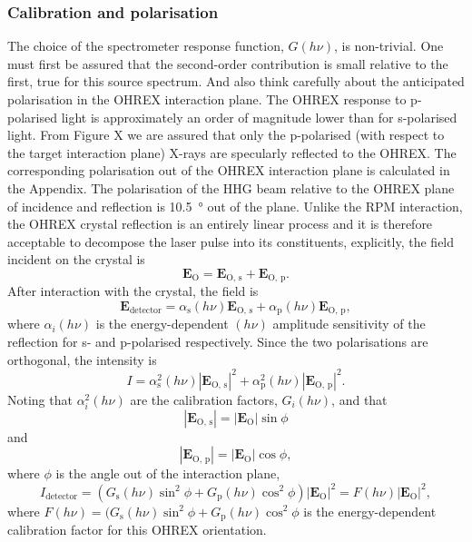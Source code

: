 \subsubsection{Calibration and polarisation}
The choice of the spectrometer response function, $G(h\nu)$, is non-trivial. One must first be assured that the second-order contribution is small relative to the first, true for this source spectrum. And also think carefully about the anticipated polarisation in the OHREX interaction plane. The OHREX response to p-polarised light is approximately an order of magnitude lower than for s-polarised light. From Figure X we are assured that only the p-polarised (with respect to the target interaction plane) X-rays are specularly reflected to the OHREX. The corresponding polarisation out of the OHREX interaction plane is calculated in the Appendix. The polarisation of the HHG beam relative to the OHREX plane of incidence and reflection is \qty{10.5}{\degree} out of the plane. Unlike the RPM interaction, the OHREX crystal reflection is an entirely linear process and it is therefore acceptable to decompose the laser pulse into its constituents, explicitly, the field incident on the crystal is
\begin{equation}
	\mathbf{E_\mathrm{O}} = \mathbf{E}_\mathrm{O,\, s} + \mathbf{E}_\mathrm{O,\, p}.
\end{equation}
After interaction with the crystal, the field is
\begin{equation}
	\mathbf{E}_\mathrm{detector} = \alpha_\mathrm{s}(h\nu)\mathbf{E}_\mathrm{O,\, s} + \alpha_\mathrm{p}(h\nu)\mathbf{E}_\mathrm{O,\, p},
\end{equation}
where $\alpha_i(h\nu)$ is the energy-dependent $(h\nu)$ amplitude sensitivity of the reflection for s- and p-polarised respectively. Since the two polarisations are orthogonal, the intensity is
\begin{equation}
	I = \alpha^2_\mathrm{s}(h\nu)|\mathbf{E}_\mathrm{O,\, s}|^2 + \alpha^2_\mathrm{p}(h\nu)|\mathbf{E}_\mathrm{O,\, p}|^2.
\end{equation}
Noting that $\alpha^2_i(h\nu)$ are the calibration factors, $G_i(h\nu)$, and that
\begin{equation}
	|\mathbf{E}_\mathrm{O,\, s}| = |\mathbf{E_\mathrm{O}}|\sin\phi
\end{equation}
and
\begin{equation}
	|\mathbf{E}_\mathrm{O,\, p}| = |\mathbf{E_\mathrm{O}}|\cos\phi,
\end{equation}
where $\phi$ is the angle out of the interaction plane,
\begin{equation}
	I_\mathrm{detector} = (G_\mathrm{s}(h\nu)\sin^2\phi + G_\mathrm{p}(h\nu)\cos^2\phi)|\mathbf{E_\mathrm{O}}|^2 = F(h\nu)|\mathbf{E_\mathrm{O}}|^2,
\end{equation}
where $F(h\nu) =  (G_\mathrm{s}(h\nu)\sin^2\phi + G_\mathrm{p}(h\nu)\cos^2\phi$ is the energy-dependent calibration factor for this OHREX orientation.


